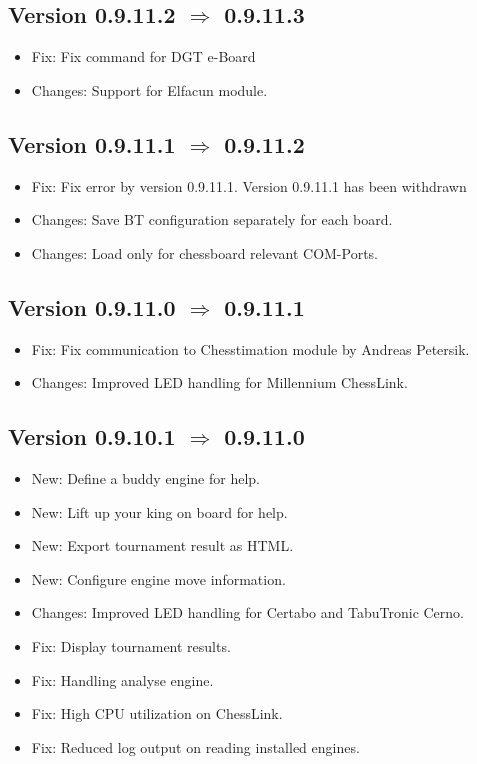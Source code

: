 \documentclass[11pt,a4paper]{article}
\begin{document}
\subsection*{Version 0.9.11.2 $\Rightarrow$  0.9.11.3}
\begin{itemize}	
	\item {\color{red}Fix}: Fix command for DGT e-Board
	\item {\color{teal}Changes}: Support for Elfacun module.
\end{itemize}


\subsection*{Version 0.9.11.1 $\Rightarrow$  0.9.11.2}
\begin{itemize}	
	\item {\color{red}Fix}: Fix error by version 0.9.11.1. Version 0.9.11.1 has been withdrawn	
	\item {\color{teal}Changes}: Save BT configuration separately for each board.
    \item {\color{teal}Changes}: Load only for chessboard relevant COM-Ports.
\end{itemize}

\subsection*{Version 0.9.11.0 $\Rightarrow$ {\color{red}0.9.11.1}}
\begin{itemize}	
	\item {\color{red}Fix}: Fix communication to Chesstimation module by Andreas Petersik.	
    \item {\color{teal}Changes}: Improved LED handling for Millennium ChessLink.
\end{itemize}


\subsection*{Version 0.9.10.1 $\Rightarrow$  0.9.11.0}
\begin{itemize}
    \item {\color{blue}New}: Define a buddy engine for help.
	\item {\color{blue}New}: Lift up your king on board for help.
    \item {\color{blue}New}: Export tournament result as HTML.
    \item {\color{blue}New}: Configure engine move information.
	\item {\color{teal}Changes}: Improved LED handling for Certabo and TabuTronic Cerno.
	\item {\color{red}Fix}: Display tournament results.	
	\item {\color{red}Fix}: Handling analyse engine.
	\item {\color{red}Fix}: High CPU utilization on ChessLink.
	\item {\color{red}Fix}: Reduced log output on reading installed engines.
\end{itemize}
\end{document}
